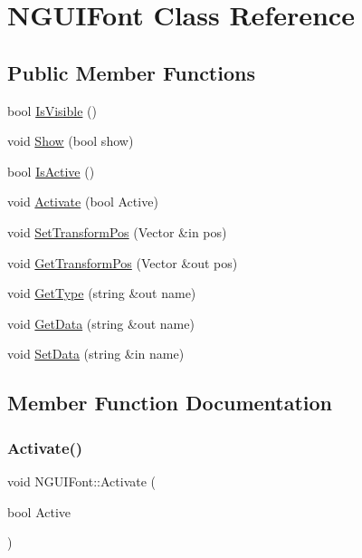 \hypertarget{class_n_g_u_i_font}{}\section{N\+G\+U\+I\+Font Class Reference}
\label{class_n_g_u_i_font}
\subsection*{Public Member Functions}
\begin{DoxyCompactItemize}
\item 
bool \hyperlink{class_n_g_u_i_font_abfa4ac4453a46933e200dd49b6f24ead}{Is\+Visible} ()
\item 
void \hyperlink{class_n_g_u_i_font_a5a719761f35fbf8dade6ac0a783e526c}{Show} (bool show)
\item 
bool \hyperlink{class_n_g_u_i_font_a467d7cbcc66f7c24de960a1f34bf844b}{Is\+Active} ()
\item 
void \hyperlink{class_n_g_u_i_font_af95ae88aad19b4d64eba8043c97ea145}{Activate} (bool Active)
\item 
void \hyperlink{class_n_g_u_i_font_a95c1abc42d5df4a850b11f344dd311a4}{Set\+Transform\+Pos} (Vector \&in pos)
\item 
void \hyperlink{class_n_g_u_i_font_a2b924c660a4d96672f7b8a39645dffa8}{Get\+Transform\+Pos} (Vector \&out pos)
\item 
void \hyperlink{class_n_g_u_i_font_a5abe2f02d48be4985cf4f265d0c08ca1}{Get\+Type} (string \&out name)
\item 
void \hyperlink{class_n_g_u_i_font_ae46b8eda099c445eabd4c66b56dae0f0}{Get\+Data} (string \&out name)
\item 
void \hyperlink{class_n_g_u_i_font_a96011fe5345a52a71cd75cf16fc75081}{Set\+Data} (string \&in name)
\end{DoxyCompactItemize}


\subsection{Member Function Documentation}
\hypertarget{class_n_g_u_i_font_af95ae88aad19b4d64eba8043c97ea145}{}\label{class_n_g_u_i_font_af95ae88aad19b4d64eba8043c97ea145} 
\subsubsection{\texorpdfstring{Activate()}{Activate()}}
{\footnotesize\ttfamily void N\+G\+U\+I\+Font\+::\+Activate (\begin{DoxyParamCaption}\item[{bool}]{Active }\end{DoxyParamCaption})}

